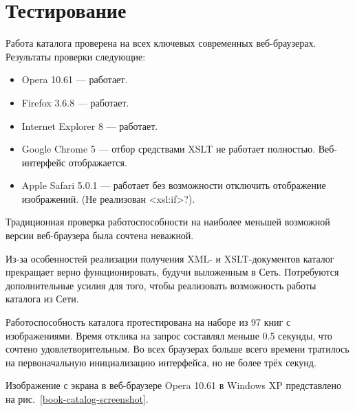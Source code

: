 \documentclass[a4paper,14pt,oneside]{extreport}
\begin{document}
\chapter{Тестирование}
Работа каталога проверена на всех ключевых современных веб-браузерах. Результаты проверки следующие:
\begin{itemize}
\item Opera 10.61 --- работает.
\item Firefox 3.6.8 --- работает.
\item Internet Explorer 8 --- работает.
\item Google Chrome 5 --- отбор средствами XSLT не работает полностью. Веб-интерфейс отображается.
\item Apple Safari 5.0.1 --- работает без возможности отключить отображение изображений. (Не реализован <xsl:if>?).
\end{itemize}

Традиционная проверка работоспособности на наиболее меньшей возможной версии веб-браузера была сочтена неважной.

Из-за особенностей реализации получения XML- и XSLT-документов каталог прекращает верно функционировать, будучи выложенным в Сеть. Потребуются дополнительные усилия для того, чтобы реализовать возможность работы каталога из Сети.

Работоспособность каталога протестирована на наборе из 97 книг с изображениями. Время отклика на запрос составлял меньше 0.5 секунды, что сочтено удовлетворительным. Во всех браузерах больше всего времени тратилось на первоначальную инициализацию интерфейса, но не более трёх секунд.

Изображение с экрана в веб-браузере Opera 10.61 в Windows XP представлено на рис.~\ref{book-catalog-screenshot}.
\end{document}
